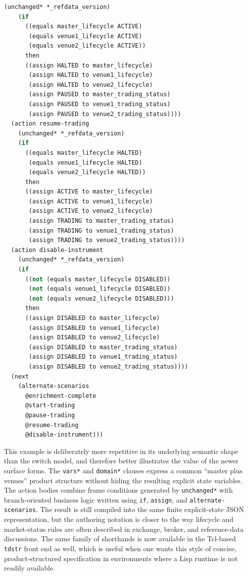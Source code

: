 \documentclass[11pt]{article}
\begin{document}
\begin{lstlisting}[language=Lisp]
    (unchanged* *_refdata_version)
    (if
      ((equals master_lifecycle ACTIVE)
       (equals venue1_lifecycle ACTIVE)
       (equals venue2_lifecycle ACTIVE))
      then
      ((assign HALTED to master_lifecycle)
       (assign HALTED to venue1_lifecycle)
       (assign HALTED to venue2_lifecycle)
       (assign PAUSED to master_trading_status)
       (assign PAUSED to venue1_trading_status)
       (assign PAUSED to venue2_trading_status))))
  (action resume-trading
    (unchanged* *_refdata_version)
    (if
      ((equals master_lifecycle HALTED)
       (equals venue1_lifecycle HALTED)
       (equals venue2_lifecycle HALTED))
      then
      ((assign ACTIVE to master_lifecycle)
       (assign ACTIVE to venue1_lifecycle)
       (assign ACTIVE to venue2_lifecycle)
       (assign TRADING to master_trading_status)
       (assign TRADING to venue1_trading_status)
       (assign TRADING to venue2_trading_status))))
  (action disable-instrument
    (unchanged* *_refdata_version)
    (if
      ((not (equals master_lifecycle DISABLED))
       (not (equals venue1_lifecycle DISABLED))
       (not (equals venue2_lifecycle DISABLED)))
      then
      ((assign DISABLED to master_lifecycle)
       (assign DISABLED to venue1_lifecycle)
       (assign DISABLED to venue2_lifecycle)
       (assign DISABLED to master_trading_status)
       (assign DISABLED to venue1_trading_status)
       (assign DISABLED to venue2_trading_status))))
  (next
    (alternate-scenarios
      @enrichment-complete
      @start-trading
      @pause-trading
      @resume-trading
      @disable-instrument)))
\end{lstlisting}

This example is deliberately more repetitive in its underlying semantic shape
than the switch model, and therefore better illustrates the value of the newer
surface forms. The \texttt{vars*} and \texttt{domain*} clauses express a common
``master plus venues'' product structure without hiding the resulting explicit
state variables. The action bodies combine frame conditions generated by
\texttt{unchanged*} with branch-oriented business logic written using
\texttt{if}, \texttt{assign}, and \texttt{alternate-scenarios}. The result is
still compiled into the same finite explicit-state JSON representation, but the
authoring notation is closer to the way lifecycle and market-status rules are
often described in exchange, broker, and reference-data discussions. The same
family of shorthands is now available in the Tcl-based \texttt{tdstr} front
end as well, which is useful when one wants this style of concise,
product-structured specification in environments where a Lisp runtime is not
readily available.
\end{document}
